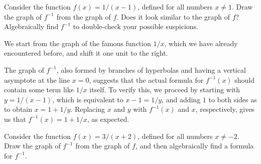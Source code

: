 \documentclass[nooutcomes]{ximera}
\begin{document}
\begin{example}
    Consider the function $f(x) = 1/(x-1)$, defined for all numbers $x\neq 1$. Draw the graph of $f^{-1}$ from the graph of $f$. Does it look similar to the graph of $f$? Algebraically find $f^{-1}$ to double-check your possible suspicions.

  \begin{explanation}
    We start from the graph of the famous function $1/x$, which we have already encountered before, and shift it one unit to the right.

    \begin{image}
    \end{image}
  \end{explanation}

The graph of $f^{-1}$, also formed by branches of hyperbolas and having a vertical asymptote at the line $x=0$, suggests that the actual formula for $f^{-1}(x)$ should contain some term like $1/x$ itself. To verify this, we proceed by starting with $y = 1/(x-1)$, which is equivalent to $x-1 = 1/y$, and adding $1$ to both sides as to obtain $x = 1+1/y$. Replacing $x$ and $y$ with $f^{-1}(x)$ and $x$, respectively, gives us that $f^{-1}(x) = 1+1/x$, as expected.  
\end{example}

\begin{exploration}
  Consider the function $f(x) = 3/(x+2)$, defined for all numbers $x\neq -2$. Draw the graph of $f^{-1}$ from the graph of $f$, and then algebraically find a formula for $f^{-1}$.
\end{exploration}
\end{document}
